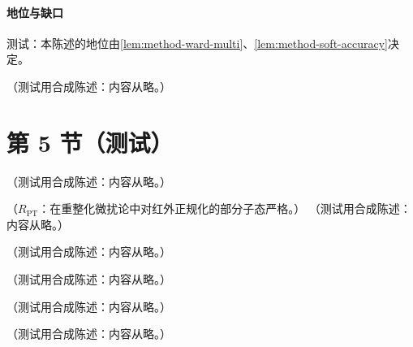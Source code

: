 \paragraph{地位与缺口}测试：本陈述的地位由\cref{lem:method-ward-multi}、\cref{lem:method-soft-accuracy}决定。

\begin{remark}[纯规范论证的地位]\label{rem:method-pure-gauge}
（测试用合成陈述：内容从略。）
\end{remark}

\section{第 5 节（测试）}\label{sec:method-subtraction}

\begin{definition}[减除项]\label{def:method-subtraction}
（测试用合成陈述：内容从略。）
\end{definition}

\begin{example}\label{ex:method-naive-induction}
（$R_{\mathrm{PT}}$：在重整化微扰论中对红外正规化的部分子态严格。）
（测试用合成陈述：内容从略。）
\end{example}

\begin{definition}[减除条件 (CS1)–(CS3)]\label{def:method-collins-conditions}
（测试用合成陈述：内容从略。）
\end{definition}

\begin{proposition}[减除的链展开]\label{prop:method-chains}
（测试用合成陈述：内容从略。）
\end{proposition}

\begin{lemma}[配对分解]\label{lem:method-pairing}
（测试用合成陈述：内容从略。）
\end{lemma}

\begin{proposition}[乘积公式]\label{prop:method-product}
（测试用合成陈述：内容从略。）
\end{proposition}

